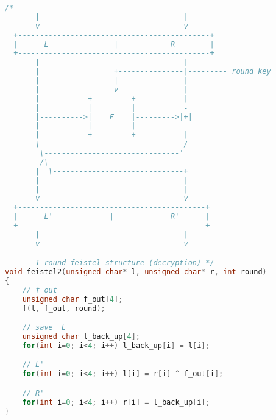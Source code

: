 \documentclass{article}
\begin{document}
\begin{lstlisting}[language=c]
/*
       |                                 |
       v                                 v
  +--------------------------------------------+
  |      L               |            R        |
  +--------------------------------------------+
       |                                 |
       |                 +---------------|--------- round key
       |                 |               |
       |                 v               |
       |           +---------+           |
       |           |         |           -
       |---------->|    F    |--------->|+|
       |           |         |           -
       |           +---------+           |
       \                                 /
        \-------------------------------'
        /\ 
       |  \------------------------------+
       |                                 |
       |                                 |
       v                                 v
  +-------------------------------------------+
  |      L'             |             R'      |
  +-------------------------------------------+
       |                                 |
       v                                 v

       1 round feistel structure (decryption) */
void feistel2(unsigned char* l, unsigned char* r, int round)
{
    // f_out
    unsigned char f_out[4];
    f(l, f_out, round);

    // save  L
    unsigned char l_back_up[4];
    for(int i=0; i<4; i++) l_back_up[i] = l[i];

    // L'
    for(int i=0; i<4; i++) l[i] = r[i] ^ f_out[i];

    // R'
    for(int i=0; i<4; i++) r[i] = l_back_up[i];
}
\end{lstlisting}
\end{document}
